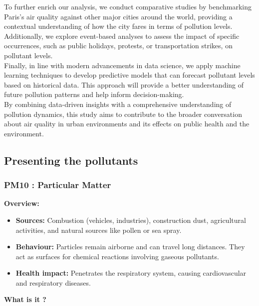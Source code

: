\documentclass{modeleRapport}
\begin{document}
To further enrich our analysis, we conduct comparative studies by benchmarking Paris’s air quality against other major 
cities around the world, providing a contextual understanding of how the city fares in terms of pollution levels. 
Additionally, we explore event-based analyses to assess the impact of specific occurrences, such as public holidays, 
protests, or transportation strikes, on pollutant levels.\\

Finally, in line with modern advancements in data science, we apply machine learning techniques to develop predictive 
models that can forecast pollutant levels based on historical data. This approach will provide a better understanding 
of future pollution patterns and help inform decision-making.\\

By combining data-driven insights with a comprehensive understanding of pollution dynamics, this study aims to contribute 
to the broader conversation about air quality in urban environments and its effects on public health and the environment.



\subsection{Presenting the pollutants}


\subsubsection{PM10 : Particular Matter}

\textbf{Overview:}\\

\begin{itemize}
    \item \textbf{Sources:} Combustion (vehicles, industries), construction dust, agricultural activities, 
    and natural sources like pollen or sea spray.
    \item \textbf{Behaviour:} Particles remain airborne and can travel long distances. They act as surfaces 
    for chemical reactions involving gaseous pollutants.
    \item \textbf{Health impact:} Penetrates the respiratory system, causing cardiovascular and respiratory diseases.\\
\end{itemize}

\textbf{What is it ?}\\
\end{document}
